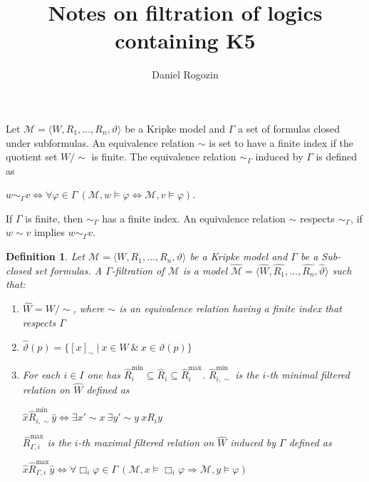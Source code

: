 \documentclass[a4paper]{article}
\author{Daniel Rogozin}
\date{}
\title{Notes on filtration of logics containing {\bf K5}}
\theoremstyle{defin}
\newtheorem{defin}{Definition}
\theoremstyle{theorem}
\theoremstyle{prop}
\theoremstyle{lemma}
\theoremstyle{fact}
\theoremstyle{ex}
\theoremstyle{col}
\theoremstyle{claim}
\begin{document}
\maketitle

Let $\mathcal{M} = \langle W, R_1, \dots, R_n, \vartheta \rangle$ be a Kripke model and $\Gamma$ a set of formulas closed under subformulas. An equivalence relation $\sim$ is set to have a finite index if the quotient set $W / \sim$ is finite. The equivalence relation $\sim_{\Gamma}$ induced by $\Gamma$ is defined as

\begin{center}
  $w \sim_{\Gamma} v \Leftrightarrow \forall \varphi \in \Gamma \: (\mathcal{M}, w \models \varphi \Leftrightarrow \mathcal{M}, v \models \varphi)$.
\end{center}

If $\Gamma$ is finite, then $\sim_{\Gamma}$ has a finite index. An equivalence relation $\sim$ respects $\sim_{\Gamma}$, if $w \sim v$ implies $w \sim_{\Gamma} v$.

\begin{defin}
  Let $\mathcal{M} = \langle W, R_1, \dots, R_n, \vartheta \rangle$ be a Kripke model and $\Gamma$ be a Sub-closed set formulas. A $\Gamma$-filtration of $\mathcal{M}$ is a model
  $\widehat{\mathcal{M}} = \langle \widehat{W}, \widehat{R_1}, \dots, \widehat{R_n}, \widehat{\vartheta} \rangle$ such that:
  \begin{enumerate}
    \item $\widehat{W} = W / \sim$, where $\sim$ is an equivalence relation having a finite index that respects $\Gamma$
    \item $\widehat{\vartheta}(p) = \{ [x]_{\sim} \: | \: x \in W \: \& \: x \in \vartheta(p)\}$
    \item For each $i \in I$ one has $\widehat{R}_i^{\text{min}} \subseteq \widehat{R}_i \subseteq \widehat{R}_i^{\text{max}}$. $\widehat{R}_{i, \sim}^{\text{min}}$ is the $i$-th minimal filtered relation on $\widehat{W}$ defined as
    \begin{center}
      $\hat{x} \widehat{R}_{i, \sim}^{\text{min}} \hat{y} \Leftrightarrow \exists x' \sim x \: \exists y' \sim y \: x R_i y$
    \end{center}
    $\widehat{R}_{\Gamma,i}^{\text{max}}$ is the $i$-th maximal filtered relation on $\widehat{W}$ induced by $\Gamma$ defined as
    \begin{center}
      $\hat{x} \widehat{R}_{\Gamma,i}^{\text{max}} \hat{y} \Leftrightarrow \forall \Box_i \varphi \in \Gamma \: (\mathcal{M}, x \models \Box_i \varphi \Rightarrow \mathcal{M}, y \models \varphi)$
    \end{center}
  \end{enumerate}
\end{defin}
\end{document}
